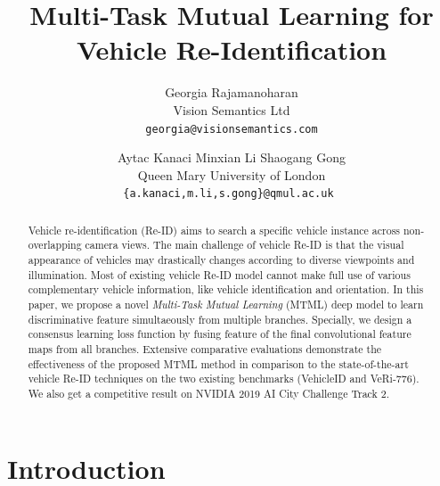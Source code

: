 \documentclass[10pt,twocolumn,letterpaper]{article}
\begin{document}
\title{Multi-Task Mutual Learning for Vehicle Re-Identification}

\author{Georgia Rajamanoharan\\
Vision Semantics Ltd\\
{\tt\small georgia@visionsemantics.com}
\and
Aytac Kanaci \hspace{0.7cm}
Minxian Li  \hspace{0.7cm}
Shaogang Gong\\
Queen Mary University of London\\
{\tt\small \{a.kanaci,m.li,s.gong\}@qmul.ac.uk }
}

\maketitle

\begin{abstract}
Vehicle re-identification (Re-ID) aims to search a specific vehicle
instance across non-overlapping camera views.
%
The main challenge of vehicle Re-ID is that
the visual appearance of vehicles may drastically changes
according to diverse viewpoints and illumination.
%
Most of existing vehicle Re-ID model cannot make full use of
various complementary vehicle information, like vehicle identification and orientation.
%
In this paper, we propose a novel {\em Multi-Task Mutual Learning} (MTML) deep model
to learn discriminative feature simultaeously from multiple branches.
%
Specially, we design a consensus learning loss function by fusing feature of the final convolutional feature maps from all branches.
%
Extensive comparative evaluations demonstrate the effectiveness of the
proposed MTML method in comparison to the state-of-the-art vehicle Re-ID techniques on the two existing benchmarks
(VehicleID and VeRi-776).
We also get a competitive result on NVIDIA 2019 AI City Challenge Track 2.
\end{abstract}

\section{Introduction}
\end{document}
